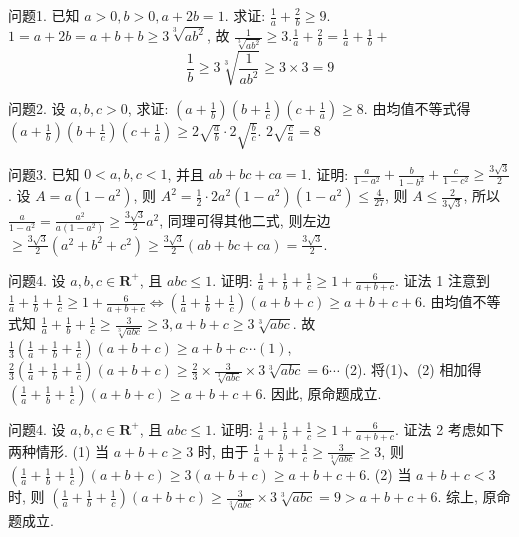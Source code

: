 
问题1. 已知 $a>0, b>0, a+2 b=1$. 求证: $\frac{1}{a}+\frac{2}{b} \geqslant 9$.
$1=a+2 b=a+b+b \geqslant 3 \sqrt[3]{a b^2}$, 故 $\frac{1}{\sqrt[3]{a b^2}} \geqslant 3 . \frac{1}{a}+\frac{2}{b}=\frac{1}{a}+\frac{1}{b}+$
$$
\frac{1}{b} \geqslant 3 \sqrt[3]{\frac{1}{a b^2}} \geqslant 3 \times 3=9
$$



问题2. 设 $a, b, c>0$, 求证: $\left(a+\frac{1}{b}\right)\left(b+\frac{1}{c}\right)\left(c+\frac{1}{a}\right) \geqslant 8$.
由均值不等式得 $\left(a+\frac{1}{b}\right)\left(b+\frac{1}{c}\right)\left(c+\frac{1}{a}\right) \geqslant 2 \sqrt{\frac{a}{b}} \cdot 2 \sqrt{\frac{b}{c}}$. $2 \sqrt{\frac{c}{a}}=8$



问题3. 已知 $0<a, b, c<1$, 并且 $a b+b c+c a=1$. 证明: $\frac{a}{1-a^2}+\frac{b}{1-b^2}+ \frac{c}{1-c^2} \geqslant \frac{3 \sqrt{3}}{2}$.
设 $A=a\left(1-a^2\right)$, 则 $A^2=\frac{1}{2} \cdot 2 a^2\left(1-a^2\right)\left(1-a^2\right) \leqslant \frac{4}{27}$, 则 $A \leqslant \frac{2}{3 \sqrt{3}}$, 所以 $\frac{a}{1-a^2}=\frac{a^2}{a\left(1-a^2\right)} \geqslant \frac{3 \sqrt{3}}{2} a^2$, 同理可得其他二式, 则左边 $\geqslant \frac{3 \sqrt{3}}{2}\left(a^2+b^2+c^2\right) \geqslant \frac{3 \sqrt{3}}{2}(a b+b c+c a)=\frac{3 \sqrt{3}}{2}$.



问题4. 设 $a, b, c \in \mathbf{R}^{+}$, 且 $a b c \leqslant 1$. 证明: $\frac{1}{a}+\frac{1}{b}+\frac{1}{c} \geqslant 1+\frac{6}{a+b+c}$.
证法 1 注意到 $\frac{1}{a}+\frac{1}{b}+\frac{1}{c} \geqslant 1+\frac{6}{a+b+c} \Leftrightarrow\left(\frac{1}{a}+\frac{1}{b}+\frac{1}{c}\right)(a+ b+c) \geqslant a+b+c+6$. 由均值不等式知 $\frac{1}{a}+\frac{1}{b}+\frac{1}{c} \geqslant \frac{3}{\sqrt[3]{a b c}} \geqslant 3, a+b+ c \geqslant 3 \sqrt[3]{a b c}$. 故 $\frac{1}{3}\left(\frac{1}{a}+\frac{1}{b}+\frac{1}{c}\right)(a+b+c) \geqslant a+b+c \cdots(1)$, $\frac{2}{3}\left(\frac{1}{a}+\frac{1}{b}+\frac{1}{c}\right)(a+b+c) \geqslant \frac{2}{3} \times \frac{3}{\sqrt[3]{a b c}} \times 3 \sqrt[3]{a b c}=6 \cdots$ (2). 将(1)、(2) 相加得 $\left(\frac{1}{a}+\frac{1}{b}+\frac{1}{c}\right)(a+b+c) \geqslant a+b+c+6$. 因此, 原命题成立.



问题4. 设 $a, b, c \in \mathbf{R}^{+}$, 且 $a b c \leqslant 1$. 证明: $\frac{1}{a}+\frac{1}{b}+\frac{1}{c} \geqslant 1+\frac{6}{a+b+c}$.
证法 2 考虑如下两种情形.
(1) 当 $a+b+c \geqslant 3$ 时, 由于 $\frac{1}{a}+\frac{1}{b}+\frac{1}{c} \geqslant\frac{3}{\sqrt[3]{a b c}} \geqslant 3$, 则 $\left(\frac{1}{a}+\frac{1}{b}+\frac{1}{c}\right)(a+b+c) \geqslant 3(a+b+c) \geqslant a+b+c+6$.
(2) 当 $a+b+c<3$ 时, 则 $\left(\frac{1}{a}+\frac{1}{b}+\frac{1}{c}\right)(a+b+c) \geqslant \frac{3}{\sqrt[3]{a b c}} \times 3 \sqrt[3]{a b c}=9>a+b+c+6$. 综上, 原命题成立.



